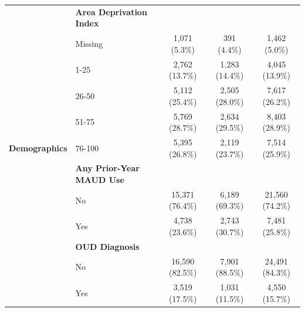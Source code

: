\documentclass[useAMS,referee, usegraphicx]{biom}
\begin{document}
\begin{table}[H]
\begin{tabular}{clccc}
                                                    & { \textbf{Area Deprivation Index}}         &                                                      &                                                     &                                                       \\
                                                    & { Missing}                                 & { 1,071 (5.3\%)}   & { 391 (4.4\%)}    & { 1,462 (5.0\%)}    \\
                                                    & { 1-25}                                    & { 2,762 (13.7\%)}  & { 1,283 (14.4\%)} & { 4,045 (13.9\%)}   \\
                                                    & { 26-50}                                   & { 5,112 (25.4\%)}  & { 2,505 (28.0\%)} & { 7,617 (26.2\%)}   \\
                                                    & { 51-75}                                   & { 5,769 (28.7\%)}  & { 2,634 (29.5\%)} & { 8,403 (28.9\%)}   \\
\multirow{-22}{*}{\textbf{Demographics}}            & { 76-100}                                  & { 5,395 (26.8\%)}  & { 2,119 (23.7\%)} & { 7,514 (25.9\%)}   \\ \midrule
                                                    & { \textbf{Any Prior-Year MAUD Use}}     &                                                      &                                                     &                                                       \\
                                                    & { No}                                      & { 15,371 (76.4\%)} & { 6,189 (69.3\%)} & { 21,560 (74.2\%)}  \\
                                                    & { Yes}                                     & { 4,738 (23.6\%)}  & { 2,743 (30.7\%)} & { 7,481 (25.8\%)}   \\
                                                    & { \textbf{OUD Diagnosis}}                  &                                                      &                                                     &                                                       \\
                                                    & { No}                                      & { 16,590 (82.5\%)} & { 7,901 (88.5\%)} & { 24,491 (84.3\%)}  \\
                                                    & { Yes}                                     & { 3,519 (17.5\%)}  & { 1,031 (11.5\%)} & { 4,550 (15.7\%)}   \\

\end{tabular}
\end{table}
\end{document}

